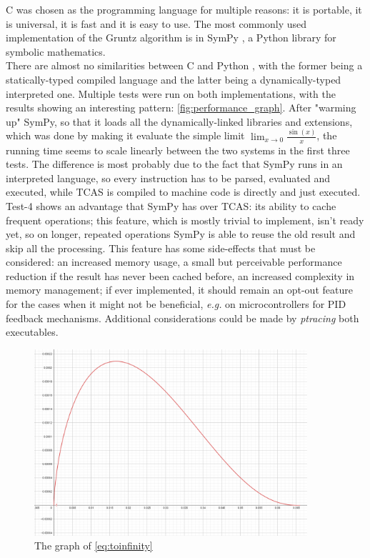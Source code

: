 \documentclass{article}
\theoremstyle{plain}
\theoremstyle{definition}
\theoremstyle{algorithm}
\begin{document}
	C was chosen as the programming language for multiple reasons: it is portable, it is universal, it is fast and it is easy to use.
	The most commonly used implementation of the Gruntz algorithm is in SymPy \cite{10.7717/peerj-cs.103}, a Python library for symbolic mathematics. \\
	There are almost no similarities between C and Python \cite{book:python}, with the former being a statically-typed \cite{wiki:typesystem} compiled language and the latter being a dynamically-typed \cite{wiki:typesystem} interpreted one. 
	Multiple tests were run on both implementations, with the results showing an interesting pattern: \cref{fig:performance_graph}. After "warming up" SymPy, so that it loads all the dynamically-linked libraries and extensions, which was done by making it evaluate the simple limit \(\lim_{x \to 0}{\frac{\sin(x)}{x}}\), the running time seems to scale linearly between the two systems in the first three tests. The difference is most probably due to the fact that SymPy runs in an interpreted language, so every instruction has to be parsed, evaluated and executed, while TCAS is compiled to machine code is directly and just executed. \\
	Test-4 shows an advantage that SymPy has over TCAS: its ability to cache frequent operations; this feature, which is mostly trivial to implement, isn't ready yet, so on longer, repeated operations SymPy is able to reuse the old result and skip all the processing. This feature has some side-effects that must be considered: an increased memory usage, a small but perceivable performance reduction if the result has never been cached before, an increased complexity in memory management; if ever implemented, it should remain an opt-out feature for the cases when it might not be beneficial, \textit{e.g.} on microcontrollers for PID \cite{wiki:pid} feedback mechanisms.
	Additional considerations could be made by \textit{ptracing} \cite{wiki:ptrace} both executables.
	
	
	\newpage
	\printbibliography
	
	\newpage
	\appendix
	\begin{figure}
		\centering
		\includegraphics[width=0.9\textwidth]{img/limoff1.PNG}
		\caption{The graph of \eqref{eq:toinfinity}}\label{fig:limoff1}
	\end{figure}
\end{document}
